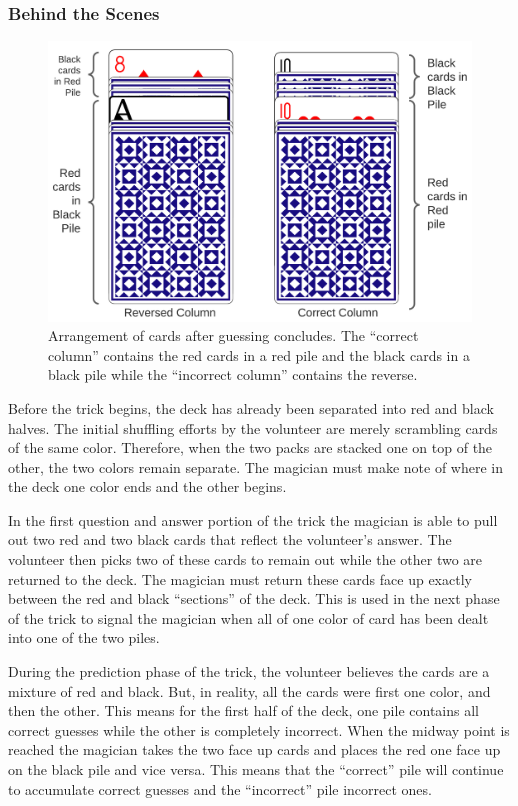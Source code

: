\subsubsection{Behind the Scenes}

\begin{figure}
\centering
\includegraphics[scale=.6]{images/Trick1}
\caption{Arrangement of cards after guessing concludes.  The ``correct column'' contains the red cards in a red pile and
the black cards in a black pile while the ``incorrect column'' contains the reverse.}
\label{fig:trick1}
\end{figure}

Before the trick begins, the deck has already
been separated into red and black halves.
The initial shuffling efforts by the volunteer are merely scrambling
cards of the same color.
Therefore, when the two packs are
stacked one on top of the other, the two colors remain
separate.
The magician must make note of where in the deck
one color ends and the other begins.

In the first question and answer portion of the trick the magician is able to
pull out two red and two black cards that reflect the volunteer's answer.  The
volunteer then picks two of these cards to remain out while the other two are
returned to the deck.  The magician must return these cards face
up exactly between the red and black ``sections'' of the deck.
This is used in the next phase of the
trick to signal the magician when all of one color of card
has been dealt into one of the two piles.

During the prediction phase of the trick, the volunteer believes the 
cards are a mixture of red and black.
But, in reality,
all the cards were first one color,  and then 
the other.
This means for the first half of the deck, one pile contains all correct
guesses while the other is completely incorrect.
When the midway point is reached the magician takes the two face up cards and places the
red one face up on the black pile and vice versa.
This means that the ``correct'' pile will continue to accumulate correct
guesses and the ``incorrect'' pile incorrect ones.

